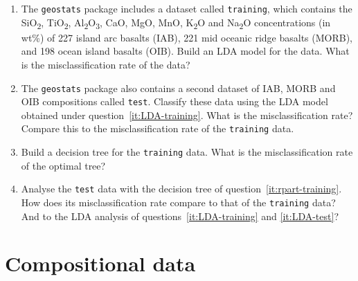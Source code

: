 \begin{enumerate}
\item\label{it:LDA-training} The \texttt{geostats} package includes a
  dataset called \texttt{training}, which contains the
  SiO\textsubscript{2}, TiO\textsubscript{2},
  Al\textsubscript{2}O\textsubscript{3}, CaO, MgO, MnO,
  K\textsubscript{2}O and Na\textsubscript{2}O concentrations (in
  wt\%) of 227 island arc basalts (IAB), 221 mid oceanic ridge basalts
  (MORB), and 198 ocean island basalts (OIB). Build an LDA model for
  the data. What is the misclassification rate of the data?
  
\item\label{it:LDA-test} The \texttt{geostats} package also contains a
  second dataset of IAB, MORB and OIB compositions called
  \texttt{test}. Classify these data using the LDA model obtained
  under question~\ref{it:LDA-training}. What is the misclassification
  rate?  Compare this to the misclassification rate of the
  \texttt{training} data.

\item\label{it:rpart-training} Build a decision tree for the
  \texttt{training} data. What is the misclassification rate of the
  optimal tree?

\item\label{it:rpart-test} Analyse the \texttt{test} data with the
  decision tree of question~\ref{it:rpart-training}. How does its
  misclassification rate compare to that of the \texttt{training}
  data? And to the LDA analysis of questions~\ref{it:LDA-training} and
  \ref{it:LDA-test}?
  
\end{enumerate}
  
\section{Compositional data}
\label{sec:ex-compositional}

